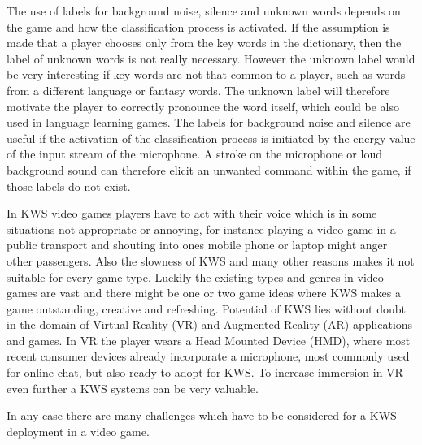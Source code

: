 The use of labels for background noise, silence and unknown words depends on the game and how the classification process is activated.
If the assumption is made that a player chooses only from the key words in the dictionary, then the label of unknown words is not really necessary.
However the unknown label would be very interesting if key words are not that common to a player, such as words from a different language or fantasy words.
The unknown label will therefore motivate the player to correctly pronounce the word itself, which could be also used in language learning games.
The labels for background noise and silence are useful if the activation of the classification process is initiated by the energy value of the input stream of the microphone.
A stroke on the microphone or loud background sound can therefore elicit an unwanted command within the game, if those labels do not exist.

In KWS video games players have to act with their voice which is in some situations not appropriate or annoying, for instance playing a video game in a public transport and shouting into ones mobile phone or laptop might anger other passengers.
Also the slowness of KWS and many other reasons makes it not suitable for every game type.
Luckily the existing types and genres in video games are vast and there might be one or two game ideas where KWS makes a game outstanding, creative and refreshing.
Potential of KWS lies without doubt in the domain of Virtual Reality (VR) and Augmented Reality (AR) applications and games.
In VR the player wears a Head Mounted Device (HMD), where most recent consumer devices already incorporate a microphone, most commonly used for online chat, but also ready to adopt for KWS.
To increase immersion in VR even further a KWS systems can be very valuable.

In any case there are many challenges which have to be considered for a KWS deployment in a video game.